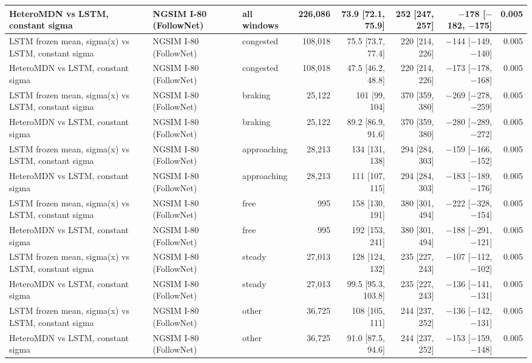 \begin{longtable}{lllrrrrr}
HeteroMDN vs LSTM, constant sigma & NGSIM I-80 (FollowNet) & all windows & 226,086 & 73.9 [72.1, 75.9] & 252 [247, 257] & $-$178 [$-$182, $-$175] & 0.005 \\
\midrule
LSTM frozen mean, sigma(x) vs LSTM, constant sigma & NGSIM I-80 (FollowNet) & congested & 108,018 & 75.5 [73.7, 77.4] & 220 [214, 226] & $-$144 [$-$149, $-$140] & 0.005 \\
\midrule
HeteroMDN vs LSTM, constant sigma & NGSIM I-80 (FollowNet) & congested & 108,018 & 47.5 [46.2, 48.8] & 220 [214, 226] & $-$173 [$-$178, $-$168] & 0.005 \\
\midrule
LSTM frozen mean, sigma(x) vs LSTM, constant sigma & NGSIM I-80 (FollowNet) & braking & 25,122 & 101 [99, 104] & 370 [359, 380] & $-$269 [$-$278, $-$259] & 0.005 \\
\midrule
HeteroMDN vs LSTM, constant sigma & NGSIM I-80 (FollowNet) & braking & 25,122 & 89.2 [86.9, 91.6] & 370 [359, 380] & $-$280 [$-$289, $-$272] & 0.005 \\
\midrule
LSTM frozen mean, sigma(x) vs LSTM, constant sigma & NGSIM I-80 (FollowNet) & approaching & 28,213 & 134 [131, 138] & 294 [284, 303] & $-$159 [$-$166, $-$152] & 0.005 \\
\midrule
HeteroMDN vs LSTM, constant sigma & NGSIM I-80 (FollowNet) & approaching & 28,213 & 111 [107, 115] & 294 [284, 303] & $-$183 [$-$189, $-$176] & 0.005 \\
\midrule
LSTM frozen mean, sigma(x) vs LSTM, constant sigma & NGSIM I-80 (FollowNet) & free & 995 & 158 [130, 191] & 380 [301, 494] & $-$222 [$-$328, $-$154] & 0.005 \\
\midrule
HeteroMDN vs LSTM, constant sigma & NGSIM I-80 (FollowNet) & free & 995 & 192 [153, 241] & 380 [301, 494] & $-$188 [$-$291, $-$121] & 0.005 \\
\midrule
LSTM frozen mean, sigma(x) vs LSTM, constant sigma & NGSIM I-80 (FollowNet) & steady & 27,013 & 128 [124, 132] & 235 [227, 243] & $-$107 [$-$112, $-$102] & 0.005 \\
\midrule
HeteroMDN vs LSTM, constant sigma & NGSIM I-80 (FollowNet) & steady & 27,013 & 99.5 [95.3, 103.8] & 235 [227, 243] & $-$136 [$-$141, $-$131] & 0.005 \\
\midrule
LSTM frozen mean, sigma(x) vs LSTM, constant sigma & NGSIM I-80 (FollowNet) & other & 36,725 & 108 [105, 111] & 244 [237, 252] & $-$136 [$-$142, $-$131] & 0.005 \\
\midrule
HeteroMDN vs LSTM, constant sigma & NGSIM I-80 (FollowNet) & other & 36,725 & 91.0 [87.5, 94.6] & 244 [237, 252] & $-$153 [$-$159, $-$148] & 0.005 \\

\end{longtable}
